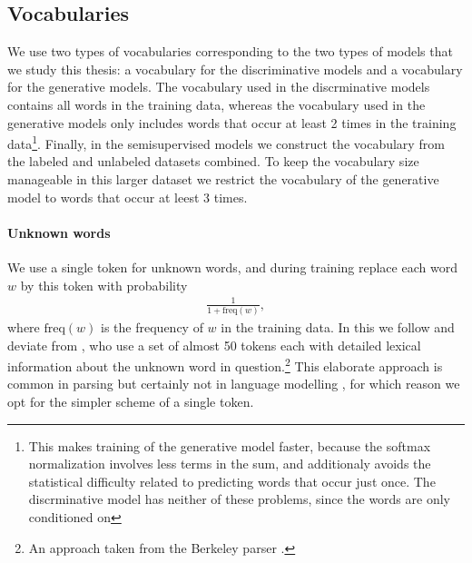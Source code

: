   \subsection{Vocabularies}
    We use two types of vocabularies corresponding to the two types of models that we study this thesis: a vocabulary for the discriminative models and a vocabulary for the generative models. The vocabulary used in the discrminative models contains all words in the training data, whereas the vocabulary used in the generative models only includes words that occur at least 2 times in the training data\footnote{This makes training of the generative model faster, because the softmax normalization involves less terms in the sum, and additionaly avoids the statistical difficulty related to predicting words that occur just once. The discrminative model has neither of these problems, since the words are only conditioned on}. Finally, in the semisupervised models we construct the vocabulary from the labeled and unlabeled datasets combined. To keep the vocabulary size manageable in this larger dataset we restrict the vocabulary of the generative model to words that occur at leest 3 times.

    \paragraph{Unknown words} We use a single token for unknown words, and during training replace each word $w$ by this token with probability
    \begin{align*}
      \frac{1}{1 + \text{freq}(w)},
    \end{align*}
    where $\text{freq}(w)$ is the frequency of $w$ in the training data. In this we follow \citet{stern2017minimal} and deviate from \citet{dyer2016rnng}, who use a set of almost 50 tokens each with detailed lexical information about the unknown word in question.\footnote{An approach taken from the Berkeley parser \citep{petrov2006learning}.} This elaborate approach is common in parsing but certainly not in language modelling \citep{dyer2016rnng}, for which reason we opt for the simpler scheme of a single token.

